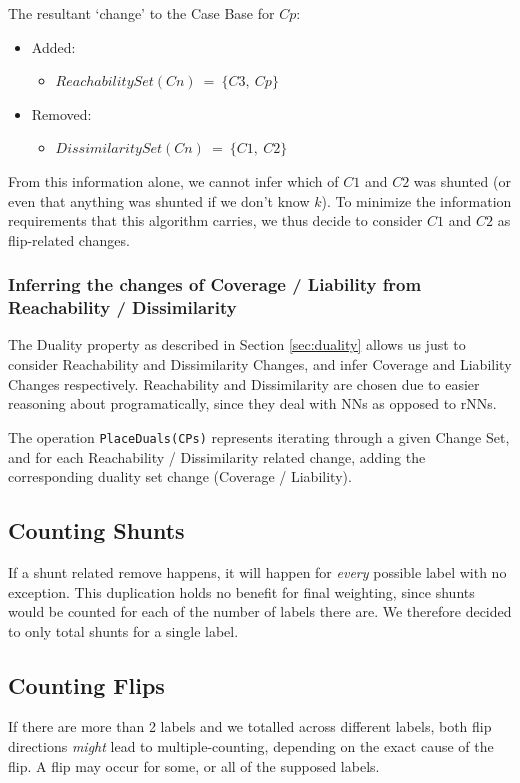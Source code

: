 \documentclass[a4paper,11pt]{report}
\begin{document}
The resultant `change' to the Case Base for $Cp$:
\begin{itemize}
	\item Added: 
	\begin{itemize}
		\item $ReachabilitySet(Cn)~=~\{C3,~Cp\}$
	\end{itemize}
	\item Removed:
	\begin{itemize}
		\item $DissimilaritySet(Cn)~=~\{C1,~C2\}$
	\end{itemize}
\end{itemize}

From this information alone, we cannot infer which of $C1$ and $C2$ was shunted (or even that anything was shunted if we don't know $k$). To minimize the information requirements that this algorithm carries, we thus decide to consider $C1$ and $C2$ as flip-related changes.

\subsubsection{Inferring the changes of Coverage / Liability from Reachability / Dissimilarity}
The Duality property as described in Section \ref{sec:duality} allows us just to consider Reachability and Dissimilarity Changes, and infer Coverage and Liability Changes respectively. Reachability and Dissimilarity are chosen due to easier reasoning about programatically, since they deal with NNs as opposed to rNNs.

The operation \verb!PlaceDuals(CPs)! represents iterating through a given Change Set, and for each Reachability / Dissimilarity related change, adding the corresponding duality set change (Coverage / Liability).

\subsection{Counting Shunts}
If a shunt related remove happens, it will happen for \emph{every} possible label with no exception. This duplication holds no benefit for final weighting, since shunts would be counted for each of the number of labels there are. We therefore decided to only total shunts for a single label.

\subsection{Counting Flips}
If there are more than 2 labels and we totalled across different labels, both flip directions \emph{might} lead to multiple-counting, depending on the exact cause of the flip. A flip may occur for some, or all of the supposed labels.
\end{document}
